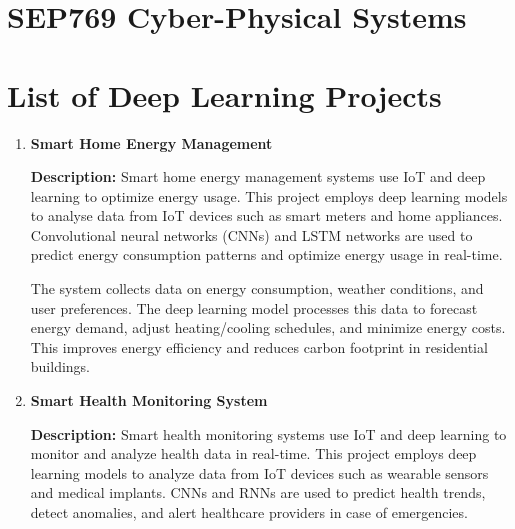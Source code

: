 \documentclass{article}
\begin{document}
\section*{\center\huge{SEP769 Cyber-Physical Systems}}
\section*{\center\Large{List of Deep Learning Projects}}

\vspace{1.5cm}
\begin{enumerate}[label=\textbf{\arabic*.}, leftmargin=*]

\vspace{24pt}
\vspace{24pt} %
\item \textbf{Smart Home Energy Management}

\textbf{Description:}
Smart home energy management systems use IoT and deep learning to optimize energy usage. This project employs deep learning models to analyse data from IoT devices such as smart meters and home appliances. Convolutional neural networks (CNNs) and LSTM networks are used to predict energy consumption patterns and optimize energy usage in real-time.

The system collects data on energy consumption, weather conditions, and user preferences. The deep learning model processes this data to forecast energy demand, adjust heating/cooling schedules, and minimize energy costs. This improves energy efficiency and reduces carbon footprint in residential buildings.



\vspace{24pt}
\item \textbf{Smart Health Monitoring System}

\textbf{Description:}
Smart health monitoring systems use IoT and deep learning to monitor and analyze health data in real-time. This project employs deep learning models to analyze data from IoT devices such as wearable sensors and medical implants. CNNs and RNNs are used to predict health trends, detect anomalies, and alert healthcare providers in case of emergencies.


\end{enumerate}
\end{document}
